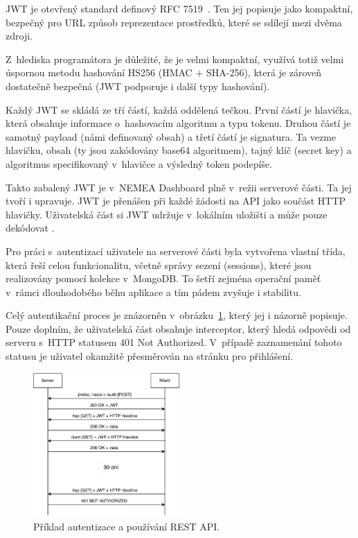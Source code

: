 JWT je otevřený standard definový RFC 7519~\cite{rfc:jwt}. Ten jej popisuje jako kompaktní, bezpečný pro URL způsob reprezentace prostředků, které se sdílejí mezi dvěma zdroji.

Z~hlediska programátora je důležité, že je velmi kompaktní, využívá totiž velmi úspornou metodu hashování HS256 (HMAC + SHA-256), která je zároveň dostatečně bezpečná (JWT podporuje i další typy hashování).

Každý JWT se skládá ze tří částí, každá oddělená tečkou. První částí je hlavička, která obsahuje informace o~hashovacím algoritmu a typu tokenu. Druhou částí je samotný payload (námi definovaný obsah) a třetí částí je signatura. Ta vezme hlavičku, obsah (ty jsou zakódovány base64 algoritmem), tajný klíč (secret key) a algoritmus specifikovaný v~hlavičce a výsledný token podepíše.

Takto zabalený JWT je v~NEMEA Dashboard plně v~režii serverové části. Ta jej tvoří i upravuje. JWT je přenášen při každé žádosti na API jako součást HTTP hlavičky. Uživatelská část si JWT udržuje v~lokálním uložišti a může pouze dekódovat .

Pro práci s~autentizací uživatele na serverové části byla vytvořena vlastní třída, která řeší celou funkcionalitu, včetně správy sezení (sessions), které jsou realizovány pomocí kolekce v~MongoDB. To šetří zejména operační paměť v~rámci dlouhodobého běhu aplikace a tím pádem zvyšuje i stabilitu.

Celý autentikační proces je znázorněn v~obrázku~\ref{fig:auth}, který jej i názorně popisuje. Pouze doplním, že uživatelská část obsahuje interceptor, který hledá odpovědi od serveru s~HTTP statusem 401 Not Authorized. V~případě zaznamenání tohoto statusu je uživatel okamžitě přesměrován na stránku pro přihlášení.

\begin{figure}[ht]
    \centering
    \includegraphics[width=0.5\textwidth]{fig/auth_flow.pdf}
    \caption{Příklad autentizace a používání REST API.} \label{fig:auth}
\end{figure}

